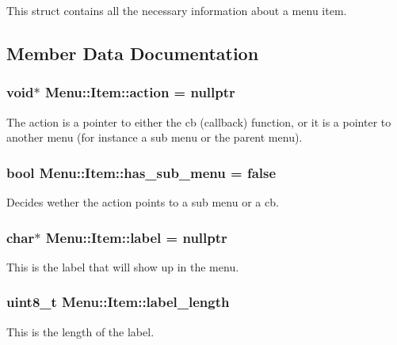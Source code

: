 This struct contains all the necessary information about a menu item. 

\subsection{Member Data Documentation}
\subsubsection[{\texorpdfstring{action}{action}}]{\setlength{\rightskip}{0pt plus 5cm}void$\ast$ Menu\+::\+Item\+::action = nullptr}\hypertarget{struct_menu_1_1_item_a247e140fed2addf80986ba5a3506b9dd}{}\label{struct_menu_1_1_item_a247e140fed2addf80986ba5a3506b9dd}
The action is a pointer to either the cb (callback) function, or it is a pointer to another menu (for instance a sub menu or the parent menu). 
\subsubsection[{\texorpdfstring{has\+\_\+sub\+\_\+menu}{has_sub_menu}}]{\setlength{\rightskip}{0pt plus 5cm}bool Menu\+::\+Item\+::has\+\_\+sub\+\_\+menu = false}\hypertarget{struct_menu_1_1_item_a5c9895a137458b9a12dafd447ac7430b}{}\label{struct_menu_1_1_item_a5c9895a137458b9a12dafd447ac7430b}
Decides wether the action points to a sub menu or a cb. 
\subsubsection[{\texorpdfstring{label}{label}}]{\setlength{\rightskip}{0pt plus 5cm}char$\ast$ Menu\+::\+Item\+::label = nullptr}\hypertarget{struct_menu_1_1_item_a378723382fc64c752a85ffe6fec9707e}{}\label{struct_menu_1_1_item_a378723382fc64c752a85ffe6fec9707e}
This is the label that will show up in the menu. 
\subsubsection[{\texorpdfstring{label\+\_\+length}{label_length}}]{\setlength{\rightskip}{0pt plus 5cm}uint8\+\_\+t Menu\+::\+Item\+::label\+\_\+length}\hypertarget{struct_menu_1_1_item_a46749d046bbbde8d5308848d5394c2dc}{}\label{struct_menu_1_1_item_a46749d046bbbde8d5308848d5394c2dc}
This is the length of the label. 

